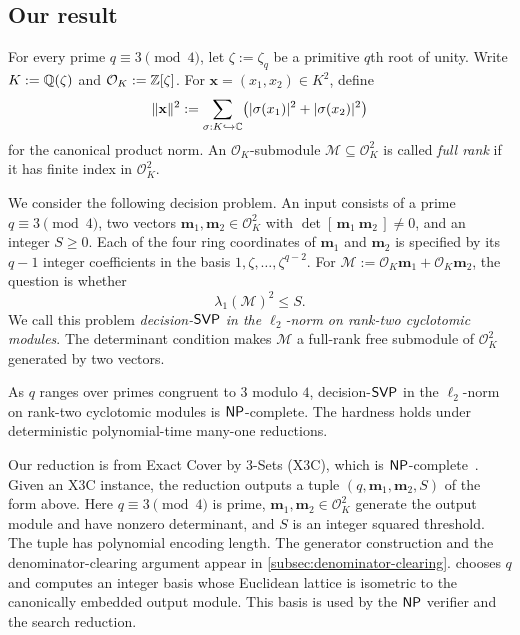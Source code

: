 \subsection{Our result}

For every prime $q\equiv3\pmod4$, let $\zeta:=\zeta_q$ be a primitive
$q$th root of unity.  Write $K:=\mathbb Q(\zeta)$ and
$\mathcal{O}_K:=\mathbb Z[\zeta]$.  For $\mathbf x=(x_1,x_2)\in K^2$, define
\[
 \|\mathbf x\|^2
 :=\sum_{\sigma:K\hookrightarrow\mathbb C}
   \bigl(|\sigma(x_1)|^2+|\sigma(x_2)|^2\bigr)
\]
 for the canonical product norm.  An $\mathcal{O}_K$-submodule
$\mathcal M\subseteq\mathcal{O}_K^2$ is called \emph{full rank} if it has finite index
in $\mathcal{O}_K^2$.

We consider the following decision problem.  An input consists of a prime
$q\equiv3\pmod4$, two vectors $\mathbf m_1,\mathbf m_2\in\mathcal{O}_K^2$
with $\det[\,\mathbf m_1\ \mathbf m_2\,]\ne0$, and an integer
 $S\ge0$.  Each of the four ring coordinates of
 $\mathbf m_1$ and $\mathbf m_2$ is specified by its $q-1$ integer
 coefficients in the basis $1,\zeta,\ldots,\zeta^{q-2}$.  For
$\mathcal M:=\mathcal{O}_K\mathbf m_1+\mathcal{O}_K\mathbf m_2$, the question
is whether
\[
 \lambda_1(\mathcal M)^2\le S.
\]
We call this problem \emph{decision-$\mathsf{SVP}$ in the $\ell_2$-norm
on rank-two cyclotomic modules}.  The determinant condition makes $\mathcal M$ a full-rank free
submodule of $\mathcal{O}_K^2$ generated by two vectors.

\begin{theorem}
\label{thm:main-intro}
As $q$ ranges over primes congruent to $3$ modulo $4$,
decision-$\mathsf{SVP}$ in the $\ell_2$-norm on rank-two cyclotomic modules is
$\mathsf{NP}$-complete.  The hardness holds under deterministic
polynomial-time many-one reductions.
\end{theorem}

Our reduction is from Exact Cover by 3-Sets (X3C), which is
$\mathsf{NP}$-complete~\cite{GareyJohnson79}.  Given an X3C instance, the
reduction outputs a tuple $(q,\mathbf m_1,\mathbf m_2,S)$ of the form above.
Here $q\equiv3\pmod4$ is prime, $\mathbf m_1,\mathbf m_2\in\mathcal{O}_K^2$
generate the output module and have nonzero determinant, and $S$ is an integer
squared threshold.  The tuple has polynomial encoding length.  The generator
 construction and the denominator-clearing argument appear in
 \cref{subsec:denominator-clearing}.
  chooses $q$ and computes an
 integer basis whose Euclidean lattice is isometric to the canonically
 embedded output module.  This basis is used by the
$\mathsf{NP}$ verifier and the search reduction.

